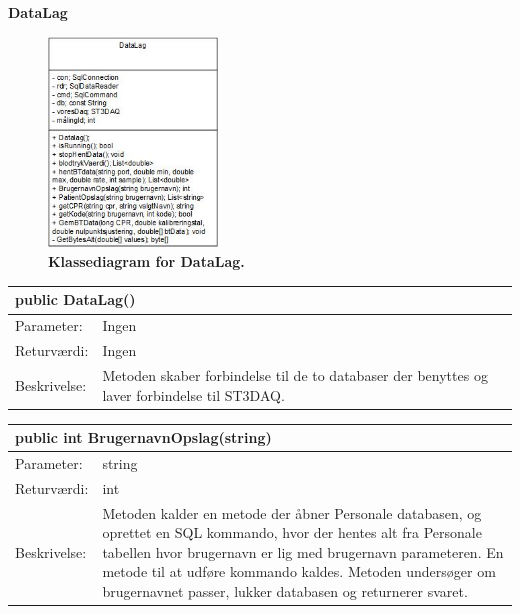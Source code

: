 \textbf{DataLag}
\begin{figure}[H]
\includegraphics[width =0.4\textwidth , center]{billeder/klassediagramdata}
\caption{\textbf{Klassediagram for DataLag.}}
\end{figure}
\begin{table}[H]
\label{tab:tabel2}
\begin{tabular}{| l | p{13cm} |}
   \hline
   \multicolumn{2}{|l|}{public DataLag()} \\ \hline
   Parameter: & Ingen\\ \hline
   Returværdi: & Ingen\\ \hline
   Beskrivelse: & Metoden skaber forbindelse til de to databaser der benyttes og laver forbindelse til ST3DAQ.\\ \hline
\end{tabular}
\end{table}
\begin{table}[H]
\label{tab:tabel2}
\begin{tabular}{| l | p{13cm} |}
   \hline
   \multicolumn{2}{|l|}{public int BrugernavnOpslag(string)} \\ \hline
   Parameter: & string \\ \hline
   Returværdi: & int\\ \hline
   Beskrivelse: & Metoden kalder en metode der åbner Personale databasen, og oprettet en SQL kommando, hvor der hentes alt fra Personale tabellen hvor brugernavn er lig med brugernavn parameteren. En metode til at udføre kommando kaldes. Metoden undersøger om brugernavnet passer, lukker databasen og returnerer svaret. \\ \hline
\end{tabular}
\end{table}
